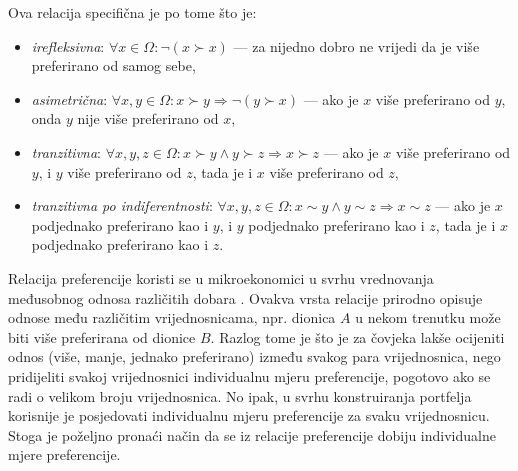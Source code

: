 \documentclass[lmodern, utf8, diplomski, numeric]{fer}
\newcommand{\q}{\left}
\newcommand{\w}{\right}
\begin{document}
  Ova relacija specifična je po tome što je:
  \begin{itemize}
    \item \textit{irefleksivna}: $\forall x \in \Omega\colon \neg \q( x \succ x \w)$ --- za nijedno dobro ne vrijedi da je više preferirano od samog sebe,
    \item \textit{asimetrična}: $\forall x, y \in \Omega\colon x \succ y \Rightarrow \neg \q( y \succ x \w)$ --- ako je $x$ više preferirano od $y$, onda $y$ nije više preferirano od $x$,
    \item \textit{tranzitivna}: $\forall x, y, z \in \Omega\colon x \succ y \wedge y \succ z \Rightarrow x \succ z$ --- ako je $x$ više preferirano od $y$, i $y$ više preferirano od $z$, tada je i $x$ više preferirano od $z$,
    \item \textit{tranzitivna po indiferentnosti}: $\forall x, y, z \in \Omega\colon x \sim y \wedge y \sim z \Rightarrow x \sim z$ --- ako je $x$ podjednako preferirano kao i $y$, i $y$ podjednako preferirano kao i $z$, tada je i $x$ podjednako preferirano kao i $z$.
  \end{itemize}
  
  Relacija preferencije koristi se u mikroekonomici u svrhu vrednovanja međusobnog odnosa različitih dobara \citep{inzeko}.
  Ovakva vrsta relacije prirodno opisuje odnose među različitim vrijednosnicama, npr. dionica $A$ u nekom trenutku može biti više preferirana od dionice $B$.
  Razlog tome je što je za čovjeka lakše ocijeniti odnos (više, manje, jednako preferirano) između svakog para vrijednosnica, nego pridijeliti svakoj vrijednosnici individualnu mjeru preferencije, pogotovo ako se radi o velikom broju vrijednosnica.
  No ipak, u svrhu konstruiranja portfelja korisnije je posjedovati individualnu mjeru preferencije za svaku vrijednosnicu.
  Stoga je poželjno pronaći način da se iz relacije preferencije dobiju individualne mjere preferencije.
  
\end{document}
